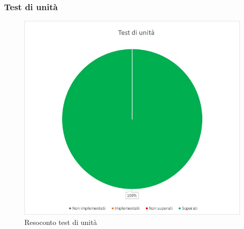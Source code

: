 \subsubsection{Test di unità}
\begin{figure} [H]
	\centering
	\includegraphics[scale=1]{Img/TU}
	\caption{Resoconto test di unità}\label{}
\end{figure}



\pagebreak
